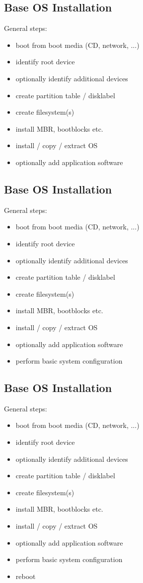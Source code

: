 \documentclass[xga]{xdvislides}
\begin{document}
\subsection{Base OS Installation}
General steps:
\begin{itemize}
	\item boot from boot media (CD, network, ...)
	\item identify root device
	\item optionally identify additional devices
	\item create partition table / disklabel
	\item create filesystem(s)
	\item install MBR, bootblocks etc.
	\item install / copy / extract OS
	\item optionally add application software
\end{itemize}

\subsection{Base OS Installation}
General steps:
\begin{itemize}
	\item boot from boot media (CD, network, ...)
	\item identify root device
	\item optionally identify additional devices
	\item create partition table / disklabel
	\item create filesystem(s)
	\item install MBR, bootblocks etc.
	\item install / copy / extract OS
	\item optionally add application software
	\item perform basic system configuration
\end{itemize}

\subsection{Base OS Installation}
General steps:
\begin{itemize}
	\item boot from boot media (CD, network, ...)
	\item identify root device
	\item optionally identify additional devices
	\item create partition table / disklabel
	\item create filesystem(s)
	\item install MBR, bootblocks etc.
	\item install / copy / extract OS
	\item optionally add application software
	\item perform basic system configuration
	\item reboot
\end{itemize}
\end{document}
